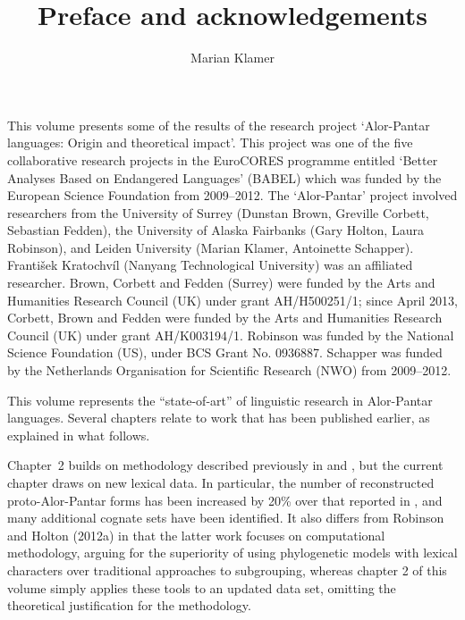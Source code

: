 \documentclass[output=paper]{LSP/langsci}
\title{Preface and acknowledgements}
\author{Marian Klamer}
\makeatletter
\renewcommand{\lsCollectionPaperTitle}{{%
  \renewcommand{\newlineTOC}{}
  \renewcommand{\newlineCover}{\\} 
  \\[-1\baselineskip]
  \noindent{\LARGE ~}\\
  \bigskip  
  \noindent\@title}}
\makeatother
\begin{document}

\noindent
This volume presents some of the results of the research project `Alor-Pantar languages: Origin and theoretical impact'. This project was one of the five collaborative research projects in the EuroCORES programme entitled `Better Analyses Based on Endangered Languages' (BABEL) which was funded by the European Science Foundation from 2009--2012. The `Alor-Pantar' project involved researchers from the University of Surrey (Dunstan Brown, Greville Corbett, Sebastian Fedden), the University of Alaska Fairbanks (Gary Holton, Laura Robinson), and Leiden University (Marian Klamer, Antoinette Schapper). František Kratochvíl (Nanyang Technological University) was an affiliated researcher. Brown, Corbett and Fedden (Surrey) were funded by the Arts and Humanities Research Council (UK) under grant AH/H500251/1; since April 2013,  Corbett, Brown and Fedden were funded by the Arts and Humanities Research Council (UK) under grant AH/K003194/1. Robinson was funded by the National Science Foundation (US), under BCS Grant No. 0936887. Schapper was funded by the Netherlands Organisation for Scientific Research (NWO) from 2009--2012. 
	
This volume represents the ``state-of-art'' of linguistic research in Alor-Pantar languages. Several chapters relate to work that has been published earlier, as explained in what follows. 

Chapter~2 builds on methodology described previously in \citet{HoltonEtAl2012} and \citet{RobinsonEtAl2012internal}, but the current chapter draws on new lexical data. In particular, the number of reconstructed proto-Alor-Pantar forms has been increased by 20\% over that reported in \citet{HoltonEtAl2012}, and many additional cognate sets have been identified. It also differs from Robinson and Holton (2012a) in that the latter work focuses on computational methodology, arguing for the superiority of using phylogenetic models with lexical characters over traditional approaches to subgrouping, whereas chapter 2 of this volume simply applies these tools to an updated data set, omitting the theoretical justification for the methodology. 
\end{document}
